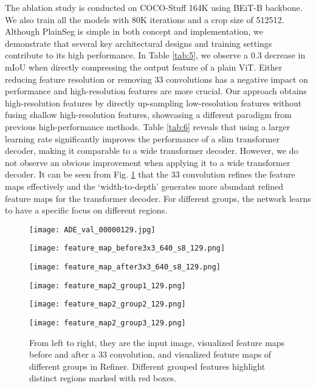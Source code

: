 \documentclass{article} \usepackage{iclr2024_conference,times}
\begin{document}
The ablation study is conducted on COCO-Stuff 164K using BEiT-B backbone. We also train all the models with 80K iterations and a crop size of 512512. Although PlainSeg is simple in both concept and implementation, we demonstrate that several key architectural designs and training settings contribute to its high performance. In Table \ref{tab:5}, we observe a 0.3 decrease in mIoU when directly compressing the output feature of a plain ViT. Either reducing feature resolution or removing 33 convolutions has a negative impact on performance and high-resolution features are more crucial. Our approach obtains high-resolution features by directly up-sampling low-resolution features without fusing shallow high-resolution features, showcasing a different paradigm from previous high-performance methods. Table \ref{tab:6} reveals that using a larger learning rate significantly improves the performance of a slim transformer decoder, making it comparable to a wide transformer decoder. However, we do not observe an obvious improvement when applying it to a wide transformer decoder. It can be seen from Fig. \ref{fig3} that the 33 convolution refines the feature maps effectively and the `width-to-depth' generates more abundant refined feature maps for the transformer decoder. For different groups, the network learns to have a specific focus on different regions.




\begin{figure}
\centering
\begin{minipage}{0.85in}
\texttt{[image: ADE\_val\_00000129.jpg]}
\end{minipage}
\begin{minipage}{0.85in}
\texttt{[image: feature\_map\_before3x3\_640\_s8\_129.png]}
\end{minipage}
\begin{minipage}{0.85in}
\texttt{[image: feature\_map\_after3x3\_640\_s8\_129.png]}
\end{minipage}
\begin{minipage}{0.85in}
\texttt{[image: feature\_map2\_group1\_129.png]}
\end{minipage}
\begin{minipage}{0.85in}
\texttt{[image: feature\_map2\_group2\_129.png]}
\end{minipage}
\begin{minipage}{0.85in}
\texttt{[image: feature\_map2\_group3\_129.png]}
\end{minipage}
\caption{From left to right, they are the input image, visualized feature maps before and after a 33 convolution, and visualized feature maps of different groups in Refiner. Different grouped features highlight distinct regions marked with red boxes.}
\label{fig3}
\end{figure}
\end{document}
